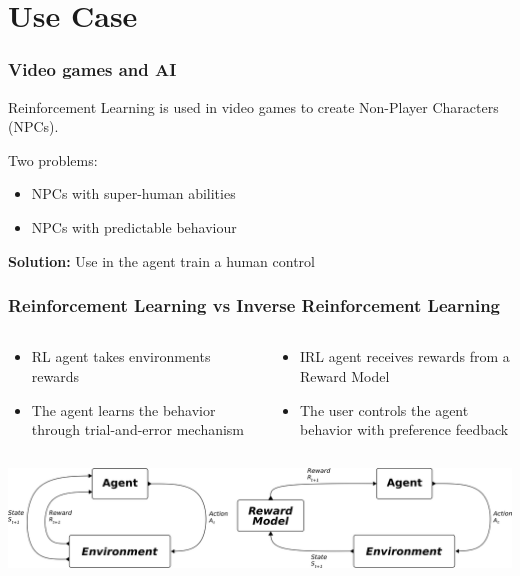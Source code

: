 \section{Use Case}

\begin{frame}
\frametitle{Video games and AI}
Reinforcement Learning is used in video games to create Non-Player Characters (NPCs).

\vspace{1cm}

Two problems:

\begin{itemize}
    \item NPCs with super-human abilities
    \item NPCs with predictable behaviour
\end{itemize}

\vspace{1cm}
\pause

\textbf{Solution:} Use in the agent train a human control %
\end{frame}


\begin{frame}
	\frametitle{Reinforcement Learning vs Inverse Reinforcement Learning}
	
 	\begin{columns}
		\begin{column}{0.5\textwidth}
			
			\begin{itemize}
				\item<1-> RL agent takes environments rewards
				\item<2-> The agent learns the behavior through trial-and-error mechanism
			\end{itemize}
			
		\end{column}
		\begin{column}{0.5\textwidth}
			\begin{itemize}
				\item<1-> IRL agent receives rewards from a Reward Model
				\item<2-> The user controls the agent behavior with preference feedback 
			\end{itemize}			
		\end{column}
		
	\end{columns}
	\vspace{1cm}
	\centering
	\includegraphics[width=1\linewidth]{images/IRL+RL.png}

\end{frame}


